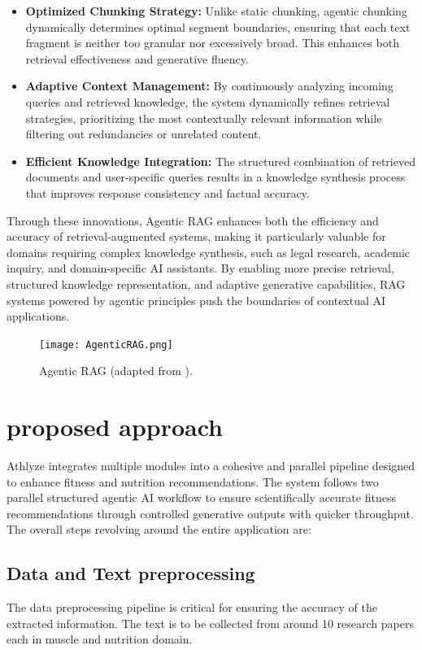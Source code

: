 \documentclass[conference]{IEEEtran}
\begin{document}
\begin{itemize}
    \item \textbf{Optimized Chunking Strategy:} Unlike static chunking, agentic chunking dynamically determines optimal segment boundaries, ensuring that each text fragment is neither too granular nor excessively broad. This enhances both retrieval effectiveness and generative fluency. \cite{3}
    \item \textbf{Adaptive Context Management:} By continuously analyzing incoming queries and retrieved knowledge, the system dynamically refines retrieval strategies, prioritizing the most contextually relevant information while filtering out redundancies or unrelated content.
    \item \textbf{Efficient Knowledge Integration:} The structured combination of retrieved documents and user-specific queries results in a knowledge synthesis process that improves response consistency and factual accuracy.
\end{itemize}

Through these innovations, Agentic RAG enhances both the efficiency and accuracy of retrieval-augmented systems, making it particularly valuable for domains requiring complex knowledge synthesis, such as legal research, academic inquiry, and domain-specific AI assistants. By enabling more precise retrieval, structured knowledge representation, and adaptive generative capabilities, RAG systems powered by agentic principles push the boundaries of contextual AI applications.

\begin{figure}[h!]
    \centering
    \texttt{[image: AgenticRAG.png]}
    \caption{Agentic RAG (adapted from \cite{12}).}
    \label{fig:RAG}
\end{figure}


\section{proposed approach}
Athlyze integrates multiple modules into a cohesive and parallel pipeline designed to enhance fitness and nutrition recommendations. The system follows two parallel structured agentic AI workflow to ensure scientifically accurate fitness recommendations through controlled generative outputs with quicker throughput. The overall steps revolving around the entire application are:

\subsection{Data and Text preprocessing}
The data preprocessing pipeline is critical for ensuring the accuracy of the extracted information. The text is to be collected from around 10 research papers each in muscle and nutrition domain.
\end{document}
